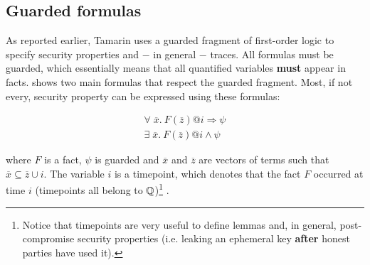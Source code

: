 \subsection{Guarded formulas}
\label{sub:guarded-formulas}

As reported earlier, Tamarin uses a guarded fragment of first-order logic to specify security properties and $-$ in general $-$ traces. All formulas must be guarded, which essentially means that all quantified variables \textbf{must} appear in facts.  shows two main formulas that respect the guarded fragment. Most, if not every, security property can be expressed using these formulas:

\begin{equation}
    \label{eq:guarded-formulas}
    \begin{gathered}
        \forall\; \overline{x}.\ F\left(\overline{z}\right) @i \Rightarrow \psi \\
        \exists\; \overline{x}.\ F\left(\overline{z}\right) @i \land \psi
    \end{gathered}
\end{equation}

where $F$ is a fact, $\psi$ is guarded and $\overline{x}$ and $\overline{z}$ are vectors of terms such that $\overline{x} \subseteq \overline{z} \cup i$.
The variable $i$ is a timepoint, which denotes that the fact $F$ occurred at time $i$ (timepoints all belong to $\mathbb{Q}$)\footnote{Notice that timepoints are very useful to define \pfs{} lemmas and, in general, post-compromise security properties (i.e. leaking an ephemeral key \textbf{after} honest parties have used it).} \cite{TamarinTeachingSlides}.
